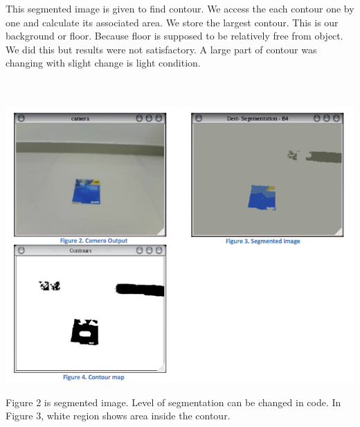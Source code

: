 \documentclass[12pt]{article}
\begin{document}
This segmented image is given to find contour. We access the each contour one by one and calculate its associated area. We store the largest contour. This is our background or floor. Because floor is supposed to be relatively free from object. We did this but results were not satisfactory. A large part of contour was changing with slight change is light condition.\\
\\
\\
\begin{center} \includegraphics[scale=0.4]{a2} \end{center}
Figure 2 is segmented image. Level of segmentation can be changed in code. In Figure 3, white region shows area inside the contour.\\
\\
\end{document}
